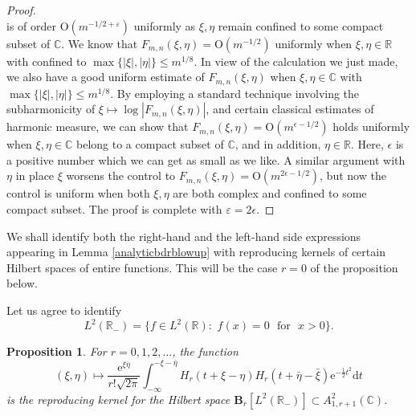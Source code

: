 \documentclass{birkart}
\newtheorem{prop}[thm]{Proposition}
\theoremstyle{definition}
\theoremstyle{remark}
\numberwithin{equation}{section}
\numberwithin{figure}{section}
\newcommand{\e}{\mathrm e}
\newcommand{\1}{{\mathbf 1}}
\newcommand{\C}{{\mathbb C}}
\newcommand{\R}{{\mathbb R}}
\newcommand{\Ordo}{\mathrm{O}}
\newcommand{\Bop}{{\mathbf B}}
\newcommand{\diff}{{\mathrm d}}
\begin{document}
\begin{proof}
\[\]
is of order $\Ordo(m^{-1/2+\varepsilon})$ uniformly as $\xi,\eta$ remain 
confined to some compact subset of $\C$. We know that
$F_{m,n}(\xi,\eta)=\Ordo(m^{-1/2})$ uniformly when $\xi,\eta\in\R$ with
confined to $\max\{|\xi|,|\eta|\}\le m^{1/8}$. In view of the calculation we 
just made, we also have a good uniform estimate of $F_{m,n}(\xi,\eta)$ when 
$\xi,\eta\in\C$ with $\max\{|\xi|,|\eta|\}\le m^{1/8}$. By employing a 
standard technique involving the subharmonicity of 
$\xi\mapsto\log|F_{m,n}(\xi,\eta)|$, and certain classical estimates 
of harmonic measure, we can show that 
$F_{m,n}(\xi,\eta)=\Ordo(m^{\epsilon-1/2})$ holds uniformly when 
$\xi,\eta\in\C$ belong to a compact subset of $\C$, and in addition, 
$\eta\in\R$. Here, $\epsilon$ is a positive number which we can get as small 
as we like. A similar argument with $\eta$ in place $\xi$ worsens the 
control to $F_{m,n}(\xi,\eta)=\Ordo(m^{2\epsilon-1/2})$, but now the control 
is uniform when both $\xi,\eta$ are both complex and confined to some compact
subset. The proof is complete with $\varepsilon=2\epsilon$. 
\end{proof}
\medskip

We shall identify both the right-hand and the left-hand side expressions 
appearing in Lemma \ref{analyticbdrblowup} with reproducing kernels of 
certain Hilbert spaces of entire functions. This will be the case $r=0$
of the proposition below.

Let us agree to identify 
\[ 
L^2(\R_-) =\{ f\in L^2(\mathbb{R}):\,\, f(x)=0 \,\,\text{ for }\,\, x>0\}.
\]

\begin{prop} 
\label{polybargmannkernel}
For $r=0,1,2,\ldots$, the function 
\[ 
(\xi,\eta)\mapsto\frac{\e^{\xi\bar\eta}}{r! \sqrt{2 \pi}}
\int_{-\infty}^{-\xi-\bar\eta} H_r(t+\xi-\eta)
H_r(t+\bar\eta-\bar\xi)\e^{-\frac12t^2} \diff t  
\]
 is the reproducing kernel for the Hilbert space $\Bop_r[L^2(\R_-)]\subset 
A^2_{1,r+1}(\C)$.
\end{prop}
\end{document}
